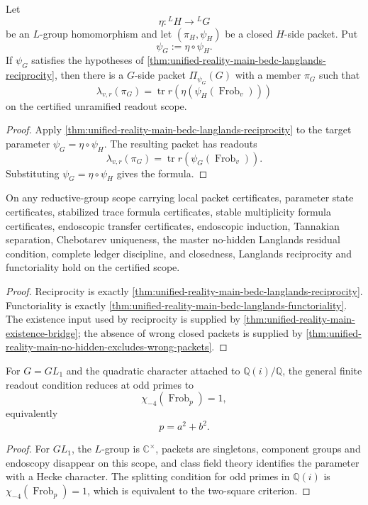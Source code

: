 \begin{theorem}
\label{thm:unified-reality-main-bedc-langlands-functoriality}
Let
$$
\eta:{}^LH\to{}^LG
$$
be an $L$-group homomorphism and let $(\pi_H,\psi_H)$ be a closed
$H$-side packet. Put
$$
\psi_G:=\eta\circ\psi_H.
$$
If $\psi_G$ satisfies the hypotheses of
\autoref{thm:unified-reality-main-bedc-langlands-reciprocity}, then
there is a $G$-side packet $\Pi_{\psi_G}(G)$ with a member $\pi_G$ such
that
$$
\lambda_{v,r}(\pi_G)
=
\operatorname{tr}r(\eta(\psi_H(\operatorname{Frob}_v)))
$$
on the certified unramified readout scope.
\end{theorem}
\begin{proof}
Apply
\autoref{thm:unified-reality-main-bedc-langlands-reciprocity} to the
target parameter $\psi_G=\eta\circ\psi_H$. The resulting packet has
readouts
$$
\lambda_{v,r}(\pi_G)
=
\operatorname{tr}r(\psi_G(\operatorname{Frob}_v)).
$$
Substituting $\psi_G=\eta\circ\psi_H$ gives the formula.
\end{proof}

\begin{theorem}
\label{thm:unified-reality-bedc-langlands-main-closure-theorem}
On any reductive-group scope carrying local packet certificates,
parameter state certificates, stabilized trace formula certificates,
stable multiplicity formula certificates, endoscopic transfer
certificates, endoscopic induction, Tannakian separation, Chebotarev
uniqueness, the master no-hidden Langlands residual condition, complete
ledger discipline, and closedness, Langlands reciprocity and
functoriality hold on the certified scope.
\end{theorem}
\begin{proof}
Reciprocity is exactly
\autoref{thm:unified-reality-main-bedc-langlands-reciprocity}.
Functoriality is exactly
\autoref{thm:unified-reality-main-bedc-langlands-functoriality}. The
existence input used by reciprocity is supplied by
\autoref{thm:unified-reality-main-existence-bridge}; the absence of
wrong closed packets is supplied by
\autoref{thm:unified-reality-main-no-hidden-excludes-wrong-packets}.
\end{proof}

\begin{corollary}
\label{cor:unified-reality-main-gl1-detector-shadow}
For $G=GL_1$ and the quadratic character attached to
$\mathbb Q(i)/\mathbb Q$, the general finite readout condition reduces
at odd primes to
$$
\chi_{-4}(\operatorname{Frob}_p)=1,
$$
equivalently
$$
p=a^2+b^2.
$$
\end{corollary}
\begin{proof}
For $GL_1$, the $L$-group is $\mathbb C^\times$, packets are
singletons, component groups and endoscopy disappear on this scope, and
class field theory identifies the parameter with a Hecke character. The
splitting condition for odd primes in $\mathbb Q(i)$ is
$\chi_{-4}(\operatorname{Frob}_p)=1$, which is equivalent to the
two-square criterion.
\end{proof}


